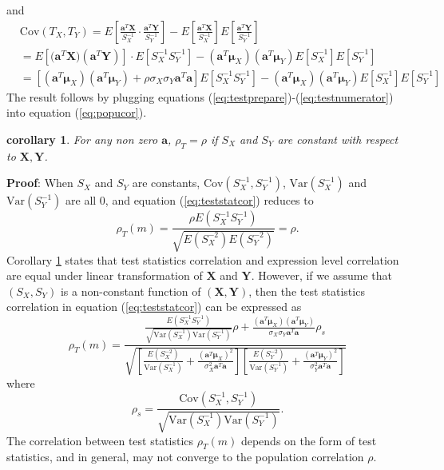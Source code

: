 \documentclass[12pt, a4paper]{article}
\newtheorem{corollary}{corollary}
\newcommand{\cov}{\text{Cov}}
\newcommand{\var}{\text{Var}}
\begin{document}
	and
	\begin{equation}\label{eq:testnumerator}
	\begin{aligned}
		&\cov(T_X, T_Y) = E\left[\frac{ \bm a^T\bm X }{S_X^{-1}}\cdot\frac{ \bm a^T\bm Y }{S_Y^{-1}}\right] - E\left[\frac{\bm a^T\bm X}{S_X^{-1}}\right]E\left[\frac{\bm a^T\bm Y}{S_Y^{-1}}\right] \\
			 & = E[\bm (\bm a^T\bm X)(\bm a^T\bm Y)]\cdot E[S_X^{-1}S_Y^{-1}]-(\bm a^T\bm \mu_X)(\bm a^T\bm \mu_Y)E[S_X^{-1}]E[S_Y^{-1}]\\
			 & = [(\bm a^T\bm \mu_X)(\bm a^T\bm \mu_Y)+ \rho \sigma_X\sigma_Y\bm a^T\bm a]E[S_X^{-1}S_Y^{-1}]- (\bm a^T\bm \mu_X)(\bm a^T\bm \mu_Y)E[S_X^{-1}]E[S_Y^{-1}]
	\end{aligned}
	\end{equation}	
	The result follows by plugging equations (\ref{eq:testprepare})-(\ref{eq:testnumerator}) into equation (\ref{eq:popucor}).
	
	\begin{corollary}\label{thm:lineartransformation} 
		For any non zero $\bm a$, $\rho_T=\rho$ if $S_X$ and $S_Y$ are constant with respect to $\bm X, \bm Y$. 
	\end{corollary}
	\textbf{Proof}: When $S_X$ and $S_Y$ are constants, $\cov(S_X^{-1}, S_Y^{-1})$, $\var(S_X^{-1}) $ and $\var(S_Y^{-1})$ are all 0, and equation (\ref{eq:teststatcor}) reduces to 
	\begin{equation}
		\rho_T(m) = \frac{\rho E(S_X^{-1}S_Y^{-1})}{\sqrt{E(S_X^{-2})E(S_Y^{-2})}} = \rho.
	\end{equation}
	Corollary \ref{thm:lineartransformation} states that test statistics correlation and expression level correlation are equal under linear transformation of $\bm X$ and $\bm Y$. However, if we assume that $(S_X, S_Y)$ is a non-constant function of $(\bm X, \bm Y)$, then the test statistics correlation in equation (\ref{eq:teststatcor}) can be expressed as  
	\begin{equation}
		\rho_T(m) = \frac{ \frac{E(S_X^{-1}S_Y^{-1})}
			{\sqrt{\var(S_X^{-1})\var(S_Y^{-1})}}\rho + \frac{(\bm a^T\bm \mu_X)(\bm a^T\bm \mu_Y)}{\sigma_X\sigma_Y\bm a^T\bm a} \rho_s	
		}{\sqrt{\left[ \frac{E(S_X^{-2})}{\var(S_X^{-1})} + \frac{(\bm a^T\bm \mu_X)^2}{\sigma_X^2\bm a^T\bm a}\right]\left[ \frac{E(S_Y^{-2})}{\var(S_Y^{-1})} + \frac{(\bm a^T\bm \mu_Y)^2}{\sigma_Y^2\bm a^T\bm a}\right]}} 
	\end{equation}
	where 
	\begin{equation}
	 \rho_s = \frac{\cov(S_X^{-1},S_Y^{-1})}{\sqrt{\var(S_X^{-1})\var(S_Y^{-1})}}.
	\end{equation}
	The correlation between test statistics $\rho_T(m)$ depends on the form of test statistics, and in general,  may not converge to the population correlation $\rho$. 
	
\end{document}
